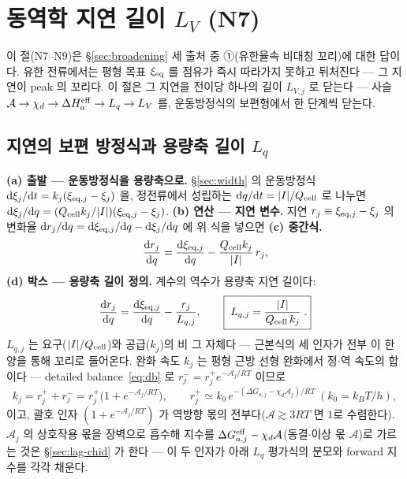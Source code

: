 \section{동역학 지연 길이 $L_V$ (N7)}\label{sec:lag}
이 절(N7--N9)은 \S\ref{sec:broadening} 세 출처 중 ①(유한율속 비대칭 꼬리)에 대한 답이다. 유한 전류에서는 평형
목표 $\xi_{\mathrm{eq}}$ 를 점유가 즉시 따라가지 못하고 뒤처진다 --- 그 지연이 peak 의 꼬리다. 이 절은 그 지연을 전이당 하나의 길이 $L_{V,j}$ 로 닫는다 --- 사슬
$\mathcal A\to\chi_d\to\Delta H_a^{\mathrm{eff}}\to L_q\to L_V$ 를, 운동방정식의 보편형에서 한 단계씩 닫는다.

\subsection{지연의 보편 방정식과 용량축 길이 $L_q$}\label{sec:lag-Lq}
\textbf{(a) 출발 --- 운동방정식을 용량축으로.} \S\ref{sec:width} 의 운동방정식 $\mathrm{d}\xi_j/\mathrm{d} t=k_j(\xi_{\mathrm{eq},j}-\xi_j)$
을, 정전류에서 성립하는 $\mathrm{d} q/\mathrm{d} t=|I|/Q_{\mathrm{cell}}$ 로 나누면 $\mathrm{d}\xi_j/\mathrm{d} q=(Q_{\mathrm{cell}} k_j/|I|)(\xi_{\mathrm{eq},j}-\xi_j)$.
\textbf{(b) 연산 --- 지연 변수.} 지연 $r_j\equiv\xi_{\mathrm{eq},j}-\xi_j$ 의 변화율 $\mathrm{d} r_j/\mathrm{d} q=\mathrm{d}\xi_{\mathrm{eq},j}/\mathrm{d} q-\mathrm{d}\xi_j/\mathrm{d} q$
에 위 식을 넣으면 \textbf{(c) 중간식.}
\begin{equation}
\frac{\mathrm{d} r_j}{\mathrm{d} q}=\frac{\mathrm{d}\xi_{\mathrm{eq},j}}{\mathrm{d} q}-\frac{Q_{\mathrm{cell}} k_j}{|I|}\,r_j,
\label{eq:Lqmid}
\end{equation}
\textbf{(d) 박스 --- 용량축 길이 정의.} 계수의 역수가 용량축 지연 길이다:
\begin{equation}
\frac{\mathrm{d} r_j}{\mathrm{d} q}=\frac{\mathrm{d}\xi_{\mathrm{eq},j}}{\mathrm{d} q}-\frac{r_j}{L_{q,j}},
\qquad \boxed{\;L_{q,j}=\frac{|I|}{Q_{\mathrm{cell}}\,k_j}\;.}
\label{eq:Lq}
\end{equation}
$L_{q,j}$ 는 요구($|I|/Q_{\mathrm{cell}}$)와 공급($k_j$)의 비 그 자체다 --- 근본식의 세 인자가 전부 이 한 양을 통해 꼬리로
들어온다. 완화 속도 $k_j$ 는 평형 근방 선형 완화에서 정$\cdot$역 속도의 합이다 --- detailed balance~\eqref{eq:db} 로
$r_j^-=r_j^+e^{-\mathcal A_j/RT}$ 이므로
\begin{equation}
k_j=r_j^++r_j^-=r_j^+\big(1+e^{-\mathcal A_j/RT}\big),
\qquad r_j^+\simeq k_0\,e^{-(\Delta G_{a,j}-\chi_d\mathcal A_j)/RT}\ (k_0=k_BT/h),
\label{eq:kuniv}
\end{equation}
이고, 괄호 인자 $(1+e^{-\mathcal A_j/RT})$ 가 역방향 몫의 전부다($\mathcal A\gtrsim3RT$ 면 $1$로 수렴한다).
$\mathcal A_j$ 의 상호작용 몫을 장벽으로 흡수해 지수를 $\Delta G_{a,j}^{\mathrm{eff}}-\chi_d\mathcal A$(동결$\cdot$이상 몫
$\mathcal A$)로 가르는 것은 \S\ref{sec:lag-chid} 가 한다 --- 이 두 인자가 아래 $L_q$ 평가식의 분모와
forward 지수를 각각 채운다.

